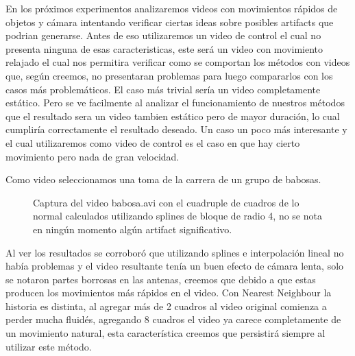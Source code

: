 En los próximos experimentos analizaremos videos con movimientos rápidos de objetos y cámara intentando verificar ciertas ideas sobre posibles artifacts que podrian generarse. Antes de eso utilizaremos un video de control el cual no presenta ninguna de esas caracteristicas, este será un video con movimiento relajado el cual nos permitira verificar como se comportan los métodos con videos que, según creemos, no presentaran problemas para luego compararlos con los casos más problemáticos. El caso más trivial sería un video completamente estático. Pero se ve facilmente al analizar el funcionamiento de nuestros métodos que el resultado sera un video tambien estático pero de mayor duración, lo cual cumpliría correctamente el resultado deseado. Un caso un poco más interesante y el cual utilizaremos como video de control es el caso en que hay cierto movimiento pero nada de gran velocidad.

Como video seleccionamos una toma de la carrera de un grupo de babosas.

\begin{figure}[H]
\centering
\begin{minipage}{0.60\textwidth}   
\end{minipage}\hfill
\caption{\footnotesize Captura del video babosa.avi con el cuadruple de cuadros de lo normal calculados utilizando splines de bloque de radio 4, no se nota en ningún momento algún artifact significativo.}
\end{figure}

Al ver los resultados se corroboró que utilizando splines e interpolación lineal no había problemas y el video resultante tenía un buen efecto de cámara lenta, solo se notaron partes borrosas en las antenas, creemos que debido a que estas producen los movimientos más rápidos en el video. Con Nearest Neighbour la historia es distinta, al agregar más de 2 cuadros al video original comienza a perder mucha fluidés, agregando 8 cuadros el video ya carece completamente de un movimiento natural, esta característica creemos que persistirá siempre al utilizar este método.

